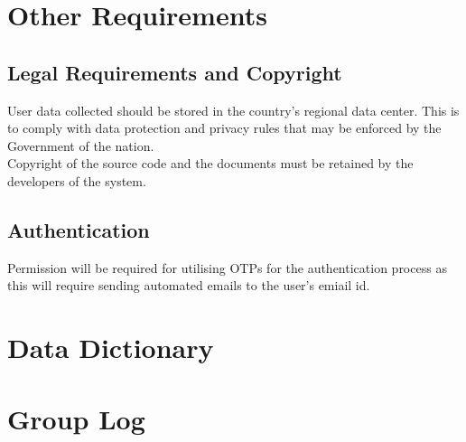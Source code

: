 \documentclass{scrreprt}
\begin{document}
\chapter{Other Requirements}
\section{Legal Requirements and Copyright}
User data collected should be stored in the country’s regional data center. This is to comply with data protection and privacy rules that may be enforced by the Government of the nation. 
\\
Copyright of the source code and the documents must be retained by the developers of the system.

\section{Authentication}
Permission will be required for utilising OTPs for the authentication process as this will require sending automated emails to the user's emiail id. 

\begin{appendices}
\chapter{Data Dictionary}

\chapter{Group Log}
\end{appendices}
\end{document}
